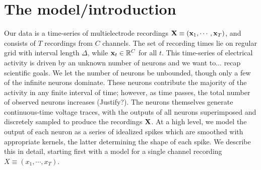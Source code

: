 \newcommand{\by}{\mathbf{y}}
\newcommand{\bA}{\mathbf{A}}

\section{The model/introduction}
Our data is a time-series of multielectrode recordings $\mathbf{X} \equiv (\mathbf{x}_1, \cdots, \mathbf{x}_T)$, and consists of $T$ recordings from $C$ channels. 
The set of recording times lie on regular grid with interval length $\Delta$, while $\mathbf{x}_t \in \mathbb{R}^C$ for all $t$. 
This time-series of electrical activity is driven by an unknown number of neurons {\color{red} and we want to... recap scientific goals}. 
We let the number of neurons be unbounded, though only a few of the infinite
neurons dominate. These neurons contribute the majority of the activity in any finite interval of time; however, as time passes, the total number of 
observed neurons increases {\color{red}(Justify?)}. 
The neurons themselves generate continuous-time voltage traces, with the outputs of all neurons superimposed and discretely sampled to produce the 
recordings $\mathbf{X}$.  At a high level, we model the output of each neuron as a
series of idealized spikes which are smoothed with appropriate kernels, the latter determining the shape of each spike. 
We describe this in detail, starting first with a model for a single channel recording $X \equiv (x_1, \cdots, x_T)$.

